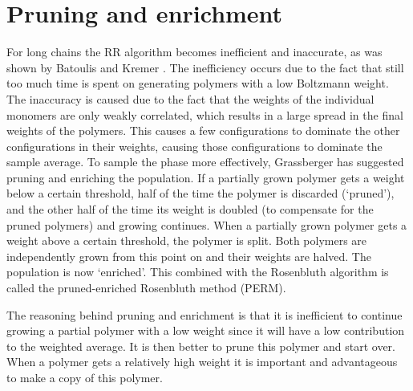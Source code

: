 \section{Pruning and enrichment}
For long chains the RR algorithm becomes inefficient and inaccurate, as was shown by Batoulis and Kremer \cite{batoulis1988statistical}. The inefficiency occurs due to the fact that still too much time is spent on generating polymers with a low Boltzmann weight. The inaccuracy is caused due to the fact that the weights of the individual monomers are only weakly correlated, which results in a large spread in the final weights of the polymers. This causes a few configurations to dominate the other configurations in their weights, causing those configurations to dominate the sample average. To sample the phase more effectively, Grassberger has suggested pruning and enriching the population. If a partially grown polymer gets a weight below a certain threshold, half of the time the polymer is discarded (`pruned'), and the other half of the time its weight is doubled (to compensate for the pruned polymers) and growing continues. When a partially grown polymer gets a weight above a certain threshold, the polymer is split. Both polymers are independently grown from this point on and their weights are halved. The population is now `enriched'. This combined with the Rosenbluth algorithm is called the pruned-enriched Rosenbluth method (PERM).

The reasoning behind pruning and enrichment is that it is inefficient to continue growing a partial polymer with a low weight since it will have a low contribution to the weighted average. It is then better to prune this polymer and start over. When a polymer gets a relatively high weight it is important and advantageous to make a copy of this polymer.

\begin{Figure}
    \vspace{18 mm}
    \centering
    \def\svgwidth{\linewidth}
    
    \label{fig:my_label}
\end{Figure}

